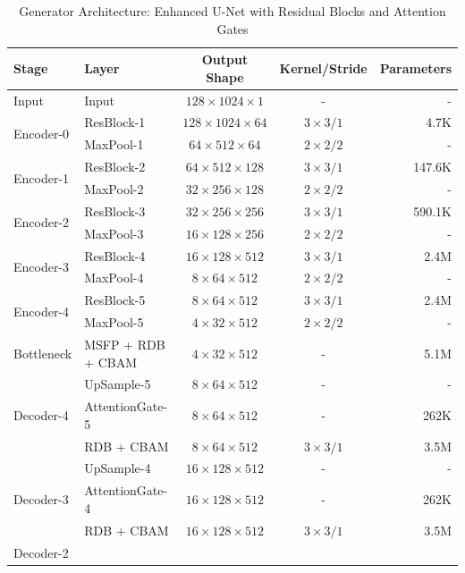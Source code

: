 \documentclass[journal]{IEEEtran}
\begin{document}
\begin{table}[t]
\centering
\caption{Generator Architecture: Enhanced U-Net with Residual Blocks and Attention Gates}
\label{tab:generator_arch}
\begin{tabular}{|l|l|c|c|r|}
\hline
\textbf{Stage} & \textbf{Layer} & \textbf{Output Shape} & \textbf{Kernel/Stride} & \textbf{Parameters} \\
\hline
Input & Input & $128 \times 1024 \times 1$ & - & - \\
\hline
\multirow{2}{*}{Encoder-0} 
& ResBlock-1 & $128 \times 1024 \times 64$ & $3 \times 3 / 1$ & 4.7K \\
& MaxPool-1 & $64 \times 512 \times 64$ & $2 \times 2 / 2$ & - \\
\hline
\multirow{2}{*}{Encoder-1}
& ResBlock-2 & $64 \times 512 \times 128$ & $3 \times 3 / 1$ & 147.6K \\
& MaxPool-2 & $32 \times 256 \times 128$ & $2 \times 2 / 2$ & - \\
\hline
\multirow{2}{*}{Encoder-2}
& ResBlock-3 & $32 \times 256 \times 256$ & $3 \times 3 / 1$ & 590.1K \\
& MaxPool-3 & $16 \times 128 \times 256$ & $2 \times 2 / 2$ & - \\
\hline
\multirow{2}{*}{Encoder-3}
& ResBlock-4 & $16 \times 128 \times 512$ & $3 \times 3 / 1$ & 2.4M \\
& MaxPool-4 & $8 \times 64 \times 512$ & $2 \times 2 / 2$ & - \\
\hline
\multirow{2}{*}{Encoder-4}
& ResBlock-5 & $8 \times 64 \times 512$ & $3 \times 3 / 1$ & 2.4M \\
& MaxPool-5 & $4 \times 32 \times 512$ & $2 \times 2 / 2$ & - \\
\hline
Bottleneck & MSFP + RDB + CBAM & $4 \times 32 \times 512$ & - & 5.1M \\
\hline
\multirow{3}{*}{Decoder-4}
& UpSample-5 & $8 \times 64 \times 512$ & - & - \\
& AttentionGate-5 & $8 \times 64 \times 512$ & - & 262K \\
& RDB + CBAM & $8 \times 64 \times 512$ & $3 \times 3 / 1$ & 3.5M \\
\hline
\multirow{3}{*}{Decoder-3}
& UpSample-4 & $16 \times 128 \times 512$ & - & - \\
& AttentionGate-4 & $16 \times 128 \times 512$ & - & 262K \\
& RDB + CBAM & $16 \times 128 \times 512$ & $3 \times 3 / 1$ & 3.5M \\
\hline
\multirow{3}{*}{Decoder-2}

\end{tabular}
\end{table}
\end{document}
